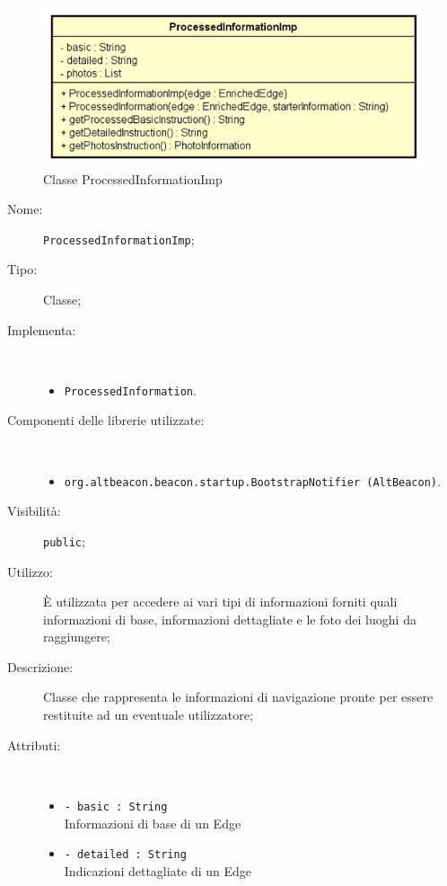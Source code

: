 \documentclass[../DefinizioneDiProdotto.tex]{subfiles}
\begin{document}
    \begin{figure}[H]
        \centering
        \includegraphics{img/ProcessedInformationImp.png}
        \caption{Classe ProcessedInformationImp}\label{fig:model::navigator::ProcessedInformationImp} 
    \end{figure}
    \begin{description}
\item[Nome:] \texttt{ProcessedInformationImp};
\item[Tipo:] Classe;
\item[Implementa:] \
\begin{itemize}
\item \texttt{ProcessedInformation}.

\end{itemize}
\item[Componenti delle librerie utilizzate:] \
\begin{itemize}
\item \texttt{org.altbeacon.beacon.startup.BootstrapNotifier (AltBeacon)}.

\end{itemize}
\item[Visibilità:] \texttt{public};
\item[Utilizzo:] È utilizzata per accedere ai vari tipi di informazioni forniti quali informazioni di base, informazioni dettagliate e le foto dei luoghi da raggiungere;
\item[Descrizione:] Classe che rappresenta le informazioni di navigazione pronte per essere restituite ad un eventuale utilizzatore;
\item[Attributi:] \
\begin{itemize}
\item \texttt{- basic : String}\\
Informazioni di base di un Edge

\item \texttt{- detailed : String}\\
Indicazioni dettagliate di un Edge


\end{itemize}
\end{description}
\end{document}
